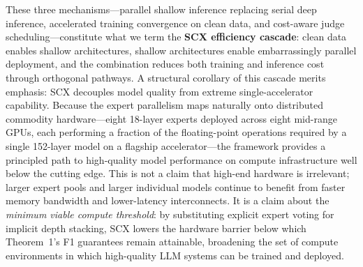 \documentclass[11pt,twocolumn]{article}
\begin{document}
These three mechanisms---parallel shallow inference replacing serial deep inference, accelerated training convergence on clean data, and cost-aware judge scheduling---constitute what we term the \textbf{SCX efficiency cascade}: clean data enables shallow architectures, shallow architectures enable embarrassingly parallel deployment, and the combination reduces both training and inference cost through orthogonal pathways. A structural corollary of this cascade merits emphasis: SCX decouples model quality from extreme single-accelerator capability. Because the expert parallelism maps naturally onto distributed commodity hardware---eight 18-layer experts deployed across eight mid-range GPUs, each performing a fraction of the floating-point operations required by a single 152-layer model on a flagship accelerator---the framework provides a principled path to high-quality model performance on compute infrastructure well below the cutting edge. This is not a claim that high-end hardware is irrelevant; larger expert pools and larger individual models continue to benefit from faster memory bandwidth and lower-latency interconnects. It is a claim about the \textit{minimum viable compute threshold}: by substituting explicit expert voting for implicit depth stacking, SCX lowers the hardware barrier below which Theorem~1's F1 guarantees remain attainable, broadening the set of compute environments in which high-quality LLM systems can be trained and deployed.
\end{document}
